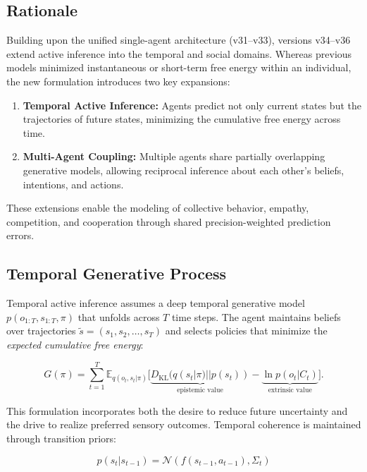 \documentclass[9pt]{elife}
\begin{document}
\subsection{Rationale}

Building upon the unified single-agent architecture (v31–v33),
versions v34–v36 extend active inference into the temporal and social domains.
Whereas previous models minimized instantaneous or short-term
free energy within an individual,
the new formulation introduces two key expansions:

\begin{enumerate}
\item \textbf{Temporal Active Inference:}  
Agents predict not only current states but the trajectories of future states,
minimizing the cumulative free energy across time.
\item \textbf{Multi-Agent Coupling:}  
Multiple agents share partially overlapping generative models,
allowing reciprocal inference about each other’s beliefs,
intentions, and actions.
\end{enumerate}

These extensions enable the modeling of collective behavior,
empathy, competition, and cooperation through shared precision-weighted
prediction errors.

\subsection{Temporal Generative Process}

Temporal active inference assumes a deep temporal generative model
$p(o_{1:T}, s_{1:T}, \pi)$ that unfolds across $T$ time steps.
The agent maintains beliefs over trajectories $\tilde{s} = (s_1, s_2, \dots, s_T)$
and selects policies that minimize the \textit{expected cumulative free energy}:

\begin{equation}
G(\pi) = \sum_{t=1}^{T} 
\mathbb{E}_{q(o_t, s_t|\pi)} 
\big[ \underbrace{D_{\mathrm{KL}}(q(s_t|\pi) || p(s_t))}_{\text{epistemic value}}
 - \underbrace{\ln p(o_t|C_t)}_{\text{extrinsic value}} \big].
\end{equation}

This formulation incorporates both the desire to reduce future uncertainty
and the drive to realize preferred sensory outcomes.
Temporal coherence is maintained through transition priors:

\[
p(s_t|s_{t-1}) = \mathcal{N}(f(s_{t-1}, a_{t-1}), \Sigma_t)
\]
\end{document}
